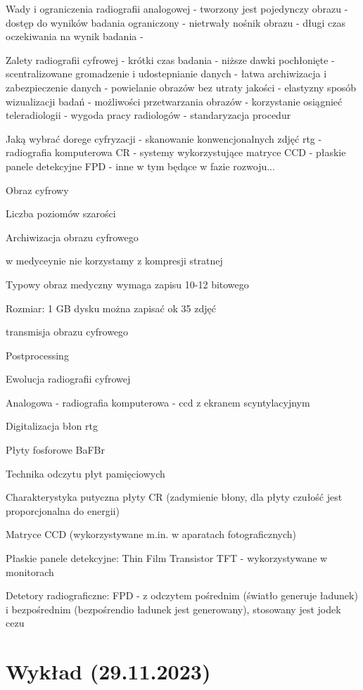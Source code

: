 \documentclass{article}
\begin{document}
Wady i ograniczenia radiografii analogowej
- tworzony jest pojedynczy obrazu
- dostęp do wyników badania ograniczony
- nietrwały nośnik obrazu
- długi czas oczekiwania na wynik badania
- 

Zalety radiografii cyfrowej
- krótki czas badania
- niższe dawki pochłonięte
- scentralizowane gromadzenie i udostepnianie danych
- łatwa archiwizacja i zabezpieczenie danych - powielanie obrazów bez utraty jakości
- elastyzny sposób wizualizacji badań
- możliwości przetwarzania obrazów
- korzystanie  osiągnieć teleradiologii
- wygoda pracy radiologów
- standaryzacja procedur

Jaką wybrać dorege cyfryzacji
- skanowanie konwencjonalnych zdjęć rtg
- radiografia komputerowa CR
- systemy wykorzystujące matryce CCD
- płaskie panele detekcyjne FPD
- inne w tym będące w fazie rozwoju...

Obraz cyfrowy

Liczba poziomów szarości

Archiwizacja obrazu cyfrowego

w medyceynie nie korzystamy z kompresji stratnej

Typowy obraz medyczny wymaga zapisu 10-12 bitowego

Rozmiar: 1 GB dysku można zapisać ok 35 zdjęć

transmisja obrazu cyfrowego

Postprocessing

Ewolucja radiografii cyfrowej

Analogowa - radiografia komputerowa - ccd z ekranem scyntylacyjnym

Digitalizacja błon rtg

Płyty fosforowe BaFBr

Technika odczytu płyt pamięciowych

Charakterystyka putyczna płyty CR (zadymienie błony, dla płyty czułość jest proporcjonalna do energii)

Matryce CCD (wykorzystywane m.in. w aparatach fotograficznych)

Płaskie panele detekcyjne: Thin Film Transistor TFT - wykorzystywane w monitorach

Detetory radiograficzne: FPD - z odczytem pośrednim (światło generuje ładunek) i bezpośrednim (bezpośrendio ładunek jest generowany), stosowany jest jodek cezu

\section{Wykład (29.11.2023)}
\end{document}

